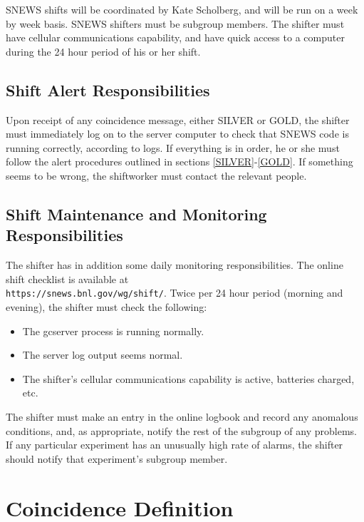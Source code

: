 \documentclass{article}
\begin{document}
SNEWS shifts will be coordinated by Kate Scholberg, and will be run on
a week by week basis.    SNEWS shifters must be subgroup members.
The shifter must have cellular communications capability, and
have quick access to a computer during the 24 hour period of
his or her shift.


\subsection{Shift Alert Responsibilities}

Upon receipt of any coincidence message, either SILVER or GOLD, the
shifter must immediately log on to the server computer to check that
SNEWS code is running correctly, according to logs.  If everything
is in order, he or she must follow
the alert procedures outlined in sections \ref{SILVER}-\ref{GOLD}.  If
something seems to be wrong, the shiftworker must contact the
relevant people.

\subsection{Shift Maintenance and Monitoring Responsibilities}

The shifter has in addition some daily monitoring responsibilities.
The online shift checklist is available at\\
\texttt{https://snews.bnl.gov/wg/shift/}.
Twice per 24 hour period (morning and evening), 
the shifter must check the following:

\begin{itemize}
\item The gcserver process is running normally.
\item The server log output seems normal.
\item The shifter's cellular communications capability is active,
batteries charged, etc.

\end{itemize}

The shifter must make an entry in the online logbook and record any
anomalous conditions, and, as appropriate, notify the rest of the subgroup
of any problems.  If any particular experiment has an unusually
high rate of alarms, the shifter should notify that experiment's
subgroup member.



\section{Coincidence Definition}
\end{document}
